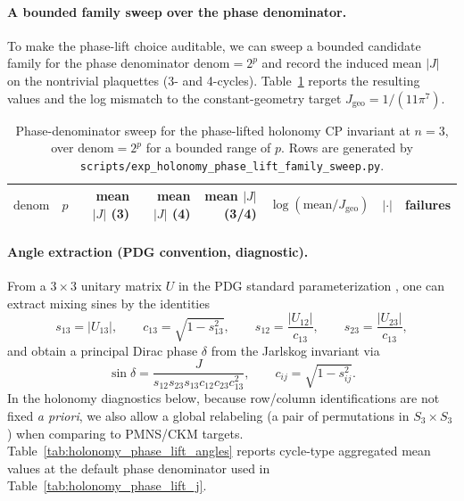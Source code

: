 \paragraph{A bounded family sweep over the phase denominator.}
To make the phase-lift choice auditable, we can sweep a bounded candidate family for the phase denominator $\mathrm{denom}=2^p$ and record the induced mean $|J|$ on the nontrivial plaquettes (3- and 4-cycles).
Table~\ref{tab:holonomy_phase_lift_family} reports the resulting values and the log mismatch to the constant-geometry target $J_{\mathrm{geo}}=1/(11\pi^7)$.

\begin{table}[t]
\centering
\scriptsize
\setlength{\tabcolsep}{6pt}
\renewcommand{\arraystretch}{1.15}
\begin{tabular}{rrrrrrrr}
\toprule
$\mathrm{denom}$ & $p$ & mean $|J|$ (3) & mean $|J|$ (4) & mean $|J|$ (3/4) & $\log(\mathrm{mean}/J_{\mathrm{geo}})$ & $|\cdot|$ & failures \\
\midrule
%
\end{tabular}
\caption{Phase-denominator sweep for the phase-lifted holonomy CP invariant at $n=3$, over $\mathrm{denom}=2^p$ for a bounded range of $p$. Rows are generated by \texttt{scripts/exp\_holonomy\_phase\_lift\_family\_sweep.py}.}
\label{tab:holonomy_phase_lift_family}
\end{table}

\paragraph{Angle extraction (PDG convention, diagnostic).}
From a $3\times 3$ unitary matrix $U$ in the PDG standard parameterization \cite{PDGRPP2024}, one can extract mixing sines by the identities
\[
s_{13}=|U_{13}|,\qquad
c_{13}=\sqrt{1-s_{13}^2},\qquad
s_{12}=\frac{|U_{12}|}{c_{13}},\qquad
s_{23}=\frac{|U_{23}|}{c_{13}},
\]
and obtain a principal Dirac phase $\delta$ from the Jarlskog invariant via
\[
\sin\delta=\frac{J}{s_{12}s_{23}s_{13}c_{12}c_{23}c_{13}^2},
\qquad
c_{ij}=\sqrt{1-s_{ij}^2}.
\]
In the holonomy diagnostics below, because row/column identifications are not fixed \emph{a priori}, we also allow a global relabeling (a pair of permutations in $S_3\times S_3$) when comparing to PMNS/CKM targets.
Table~\ref{tab:holonomy_phase_lift_angles} reports cycle-type aggregated mean values at the default phase denominator used in Table~\ref{tab:holonomy_phase_lift_j}.

